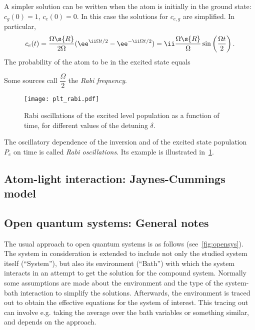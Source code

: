 \documentclass[fontsize=9pt,bookmarkpackage=false]{scrartcl}
\newcommand*{\mybx}[1]{\colorbox{mygr!15}{\hspace{1em}#1\hspace{1em}}}
\begin{document}
A simpler solution can be written when the atom is initially in the ground state: $c_g (0) = 1$, $c_e (0) = 0$.
In this case the solutions for $c_{e,g }$ are simplified.
In particular,
\begin{equation}
  c_e (t)
  = \frac{ \Omega\s{R} }{ 2 \Omega } ( \ee^{ \ii \Omega t / 2 } - \ee^{- \ii \Omega t /2 } )
  = \ii \frac{ \Omega\s{R} }{  \Omega } \sin \left( \frac{ \Omega t }{ 2 } \right).
\end{equation}
The probability of the atom to be in the excited state equals
Some sources call $\dfrac \Omega  2 $ the \emph{Rabi frequency}.

\begin{figure}[htb]
  \centering
  \texttt{[image: plt\_rabi.pdf]}
  \caption{Rabi oscillations of the excited level population as a function of time, for different values of the detuning $\delta$.}
  \label{fig:plt_rabi-pdf}
\end{figure}
The oscillatory dependence of the inversion and of the excited state population $P_e$ on time is called \emph{Rabi oscillations}.
Its example is illustrated in~\cref{fig:plt_rabi-pdf}.



\subsection{Atom-light interaction: Jaynes-Cummings model} %
\label{sec:atom_light_interaction_jaynes_cummings_model}


\subsection{Open quantum systems: General notes} %
\label{sec:open_quantum_systems}

The usual approach to open quantum systems is as follows (see~\cref{fig:opensys}).
The system in consideration is extended to include not only the studied system itself (``System''), but also its environment (``Bath'') with which the system interacts in an attempt to get the solution for the compound system.
Normally some assumptions are made about the environment and the type of the system-bath interaction to simplify the solutions.
Afterwards, the environment is traced out to obtain the effective equations for the system of interest.
This tracing out can involve e.g. taking the average over the bath variables or something similar, and depends on the approach.
\end{document}
